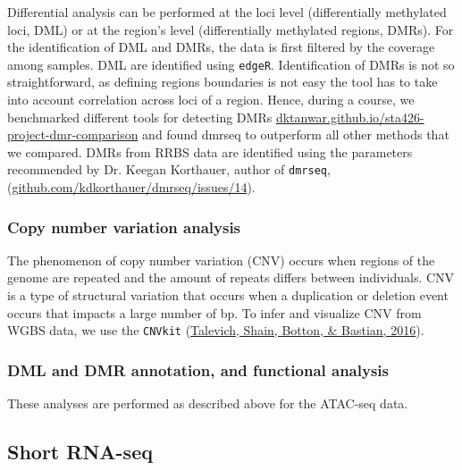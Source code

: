 \documentclass[12pt,twoside]{reedthesis}
\begin{document}
Differential analysis can be performed at the loci level (differentially
methylated loci, DML) or at the region's level (differentially
methylated regions, DMRs). For the identification of DML and DMRs, the
data is first filtered by the coverage among samples. DML are identified
using \texttt{edgeR}. Identification of DMRs is not so straightforward, as
defining regions boundaries is not easy the tool has to take into
account correlation across loci of a region. Hence, during a course, we
benchmarked different tools for detecting DMRs
\href{https://dktanwar.github.io/sta426-project-dmr-comparison/report/project_report.html}{dktanwar.github.io/sta426-project-dmr-comparison}
and found dmrseq to outperform all other methods that we compared. DMRs
from RRBS data are identified using the parameters recommended by Dr.
Keegan Korthauer, author of \texttt{dmrseq},
(\href{https://github.com/kdkorthauer/dmrseq/issues/14}{github.com/kdkorthauer/dmrseq/issues/14}).

\hypertarget{m3.5.3}{%
\subsubsection*{Copy number variation analysis}\label{m3.5.3}}

The phenomenon of copy number variation (CNV) occurs when regions of the
genome are repeated and the amount of repeats differs between
individuals. CNV is a type of structural variation that occurs when a
duplication or deletion event occurs that impacts a large number of bp. To infer and visualize CNV from WGBS data, we use the \texttt{CNVkit}
(\protect\hyperlink{ref-talevich2016}{Talevich, Shain, Botton, \& Bastian, 2016}).

\hypertarget{m3.5.4}{%
\subsubsection*{DML and DMR annotation, and functional analysis}\label{m3.5.4}}

These analyses are performed as described above for the ATAC-seq data.

\hypertarget{m3.6}{%
\subsection*{Short RNA-seq}\label{m3.6}}
\end{document}
